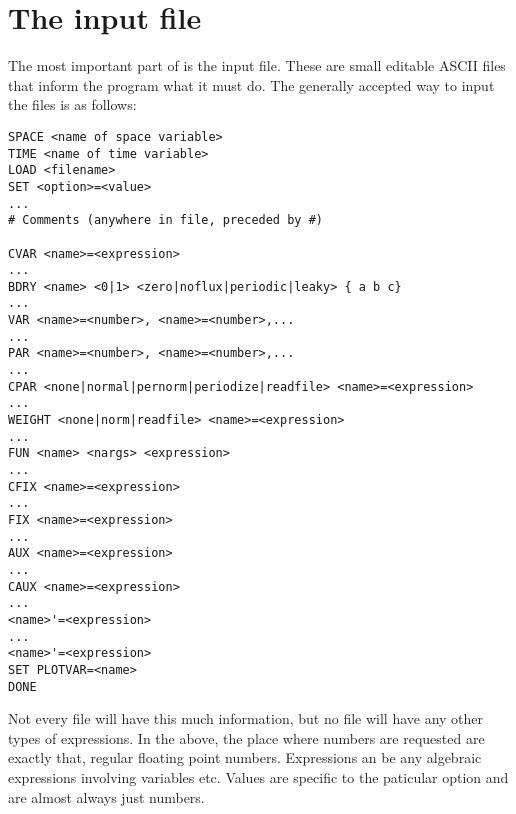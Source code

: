 \section{The input file}
The most important part of \xtc is the input file.  These are small
editable ASCII files that inform the program what it must do.  The
generally accepted way to input the files is as follows:
\begin{verbatim}
SPACE <name of space variable>
TIME <name of time variable>
LOAD <filename>
SET <option>=<value>
...
# Comments (anywhere in file, preceded by #)

CVAR <name>=<expression>
...
BDRY <name> <0|1> <zero|noflux|periodic|leaky> { a b c}
...
VAR <name>=<number>, <name>=<number>,...
...
PAR <name>=<number>, <name>=<number>,...
...
CPAR <none|normal|pernorm|periodize|readfile> <name>=<expression>
...
WEIGHT <none|norm|readfile> <name>=<expression>
...
FUN <name> <nargs> <expression>
...
CFIX <name>=<expression>
...
FIX <name>=<expression>
...
AUX <name>=<expression>
...
CAUX <name>=<expression>
...
<name>'=<expression>
...
<name>'=<expression>
SET PLOTVAR=<name>
DONE
\end{verbatim}

Not every file will have this much information, but no file will have
any other types of expressions.  In the above, the place where numbers
are requested are exactly that, regular floating point numbers.
Expressions an be any algebraic expressions involving variables etc.
Values are specific to the paticular option and are almost always just
numbers.


